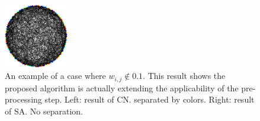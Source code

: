 \documentclass[dvipdfmx,10pt,journal,compsoc]{IEEEtran}
\begin{document}
\begin{figure}[!t]
\begin{minipage}{\columnwidth}
\begin{minipage}{0.4\columnwidth}
    \end{minipage}
    \begin{minipage}{0.4\columnwidth}
      \centering
      \includegraphics[height=2.8cm]{circle/vis/dense_SA-L-BFGS_10.png}
    \end{minipage}
    \caption{
      An example of a case where $w_{i,j} \notin \qty{0,1}$.
      This result shows the proposed algorithm is actually extending the applicability of the pre-processing step.
      Left: result of \textsf{CN}. separated by colors.
      Right: result of \textsf{SA}. No separation.
    }
    \label{fig:weightedDense}
  \end{minipage}
\end{figure}
\end{document}
